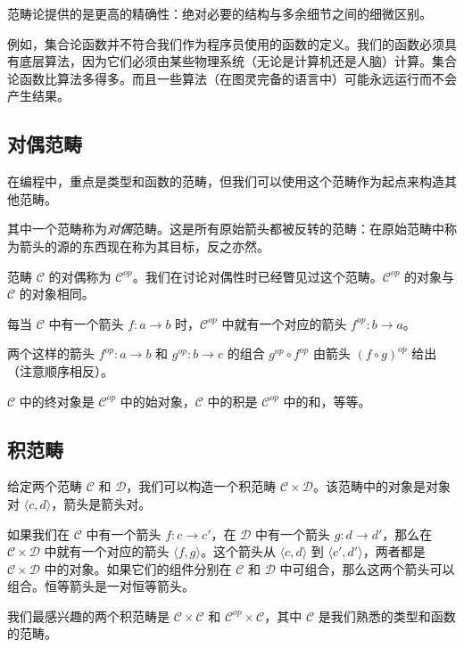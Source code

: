\documentclass[DaoFP]{subfiles}
\begin{document}
范畴论提供的是更高的精确性：绝对必要的结构与多余细节之间的细微区别。

例如，集合论函数并不符合我们作为程序员使用的函数的定义。我们的函数必须具有底层算法，因为它们必须由某些物理系统（无论是计算机还是人脑）计算。集合论函数比算法多得多。而且一些算法（在图灵完备的语言中）可能永远运行而不会产生结果。

\subsection{对偶范畴}
在编程中，重点是类型和函数的范畴，但我们可以使用这个范畴作为起点来构造其他范畴。

其中一个范畴称为\emph{对偶}范畴。这是所有原始箭头都被反转的范畴：在原始范畴中称为箭头的源的东西现在称为其目标，反之亦然。

范畴 $\mathcal{C}$ 的对偶称为 $\mathcal{C}^{op}$。我们在讨论对偶性时已经瞥见过这个范畴。$\mathcal{C}^{op}$ 的对象与 $\mathcal{C}$ 的对象相同。

每当 $\mathcal{C}$ 中有一个箭头 $f \colon a \to b$ 时，$\mathcal{C}^{op}$ 中就有一个对应的箭头 $f^{op} \colon b \to a$。

两个这样的箭头 $f^{op} \colon a \to b$ 和 $g^{op} \colon b \to c$ 的组合 $g^{op} \circ f^{op}$ 由箭头 $(f \circ g)^{op}$ 给出（注意顺序相反）。

$\mathcal{C}$ 中的终对象是 $\mathcal{C}^{op}$ 中的始对象，$\mathcal{C}$ 中的积是 $\mathcal{C}^{op}$ 中的和，等等。

\subsection{积范畴}

给定两个范畴 $\mathcal{C}$ 和 $\mathcal{D}$，我们可以构造一个积范畴 $\mathcal{C} \times \mathcal{D}$。该范畴中的对象是对象对 $\langle c, d \rangle $，箭头是箭头对。

如果我们在 $\mathcal{C}$ 中有一个箭头 $f \colon c \to c'$，在 $\mathcal{D}$ 中有一个箭头 $g \colon d \to d'$，那么在 $\mathcal{C} \times \mathcal{D}$ 中就有一个对应的箭头 $\langle f, g \rangle$。这个箭头从 $\langle c, d \rangle $ 到 $\langle c', d' \rangle $，两者都是 $\mathcal{C} \times \mathcal{D}$ 中的对象。如果它们的组件分别在 $\mathcal{C}$ 和 $\mathcal{D}$ 中可组合，那么这两个箭头可以组合。恒等箭头是一对恒等箭头。

我们最感兴趣的两个积范畴是 $\mathcal{C} \times \mathcal{C}$ 和 $\mathcal{C}^{op} \times \mathcal{C}$，其中 $\mathcal{C}$ 是我们熟悉的类型和函数的范畴。
\end{document}
